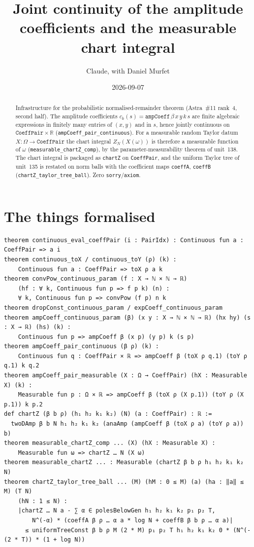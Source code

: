 \documentclass[11pt]{article}
\title{Joint continuity of the amplitude coefficients and the measurable chart integral}
\author{Claude, with Daniel Murfet}
\date{2026-09-07}
\begin{document}
\maketitle
\sloppy

\begin{abstract}
Infrastructure for the probabilistic normalised-remainder theorem (Astra~\#11 rank~4, second half).
The amplitude coefficients $c_k(s)=\texttt{ampCoeff}\,\beta\,x\,y\,k\,s$ are finite algebraic
expressions in finitely many entries of $(x,y)$ and in $s$, hence jointly continuous on
$\texttt{CoeffPair}\times\mathbb R$ (\texttt{ampCoeff\_pair\_continuous}). For a measurable random
Taylor datum $X\colon\Omega\to\texttt{CoeffPair}$ the chart integral $Z_N(X(\omega))$ is therefore a
measurable function of $\omega$ (\texttt{measurable\_chartZ\_comp}), by the parameter-measurability
theorem of unit~138. The chart integral is packaged as \texttt{chartZ} on \texttt{CoeffPair}, and the
uniform Taylor tree of unit~135 is restated on norm balls with the coefficient maps
\texttt{coeffA}, \texttt{coeffB} (\texttt{chartZ\_taylor\_tree\_ball}). Zero \texttt{sorry}/\texttt{axiom}.
\end{abstract}

\section{The things formalised}
{\small
\begin{verbatim}
theorem continuous_eval_coeffPair (i : PairIdx) : Continuous fun a : CoeffPair => a i
theorem continuous_toX / continuous_toY (ρ) (k) :
    Continuous fun a : CoeffPair => toX ρ a k
theorem convPow_continuous_param (f : X → ℕ × ℕ → ℝ)
    (hf : ∀ k, Continuous fun p => f p k) (n) :
    ∀ k, Continuous fun p => convPow (f p) n k
theorem dropConst_continuous_param / expCoeff_continuous_param
theorem ampCoeff_continuous_param (β) (x y : X → ℕ × ℕ → ℝ) (hx hy) (s : X → ℝ) (hs) (k) :
    Continuous fun p => ampCoeff β (x p) (y p) k (s p)
theorem ampCoeff_pair_continuous (β ρ) (k) :
    Continuous fun q : CoeffPair × ℝ => ampCoeff β (toX ρ q.1) (toY ρ q.1) k q.2
theorem ampCoeff_pair_measurable (X : Ω → CoeffPair) (hX : Measurable X) (k) :
    Measurable fun p : Ω × ℝ => ampCoeff β (toX ρ (X p.1)) (toY ρ (X p.1)) k p.2
def chartZ (β b ρ) (h₁ h₂ k₁ k₂) (N) (a : CoeffPair) : ℝ :=
  twoDAmp β b N h₁ h₂ k₁ k₂ (anaAmp (ampCoeff β (toX ρ a) (toY ρ a)) b)
theorem measurable_chartZ_comp ... (X) (hX : Measurable X) :
    Measurable fun ω => chartZ … N (X ω)
theorem measurable_chartZ ... : Measurable (chartZ β b ρ h₁ h₂ k₁ k₂ N)
theorem chartZ_taylor_tree_ball ... (M) (hM : 0 ≤ M) (a) (ha : ‖a‖ ≤ M) (T N)
    (hN : 1 ≤ N) :
    |chartZ … N a - ∑ α ∈ polesBelowGen h₁ h₂ k₁ k₂ p₁ p₂ T,
        N^(-α) * (coeffA β ρ … α a * log N + coeffB β b ρ … α a)|
      ≤ uniformTreeConst β b ρ M (2 * M) p₁ p₂ T h₁ h₂ k₁ k₂ 0 * (N^(-(2 * T)) * (1 + log N))
\end{verbatim}
}
\end{document}
